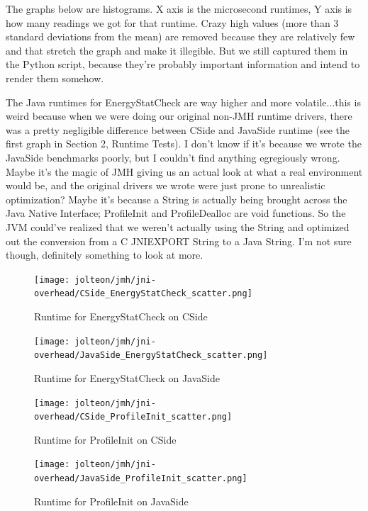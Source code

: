 \documentclass{article}
\begin{document}
    The graphs below are histograms. X axis is the microsecond runtimes, Y axis is how many readings we got
    for that runtime. Crazy high values (more than 3 standard deviations from the mean) are removed because they are relatively few and that stretch the graph and make it illegible. But we still captured
    them in the Python script, because they're probably important information and intend to render them somehow.

    The Java runtimes for EnergyStatCheck are way higher and more volatile...this is weird because when we were doing our original non-JMH runtime drivers,
    there was a pretty negligible difference between CSide and JavaSide runtime (see the first graph in Section 2, Runtime Tests). I don't know if it's because we wrote the JavaSide benchmarks poorly, but I couldn't find anything egregiously wrong. Maybe it's the magic of JMH giving us an actual look at what a real environment would be, and the original drivers we wrote were just prone to unrealistic optimization? Maybe it's because a String is actually being brought across the Java Native Interface; ProfileInit and ProfileDealloc are void functions. So the JVM could've realized that we weren't actually using the String and optimized out the conversion from a C JNIEXPORT String to a Java String. I'm not sure though, definitely something to look at more.
    
    
    \begin{figure}[H]
	    \centering
	    \texttt{[image: jolteon/jmh/jni-overhead/CSide\_EnergyStatCheck\_scatter.png]}
	    \caption{Runtime for EnergyStatCheck on CSide}
	    \label{fig:jolteon-jmh-runtime-energystatcheck-c}
    \end{figure}
    \begin{figure}[H]
	    \centering
	    \texttt{[image: jolteon/jmh/jni-overhead/JavaSide\_EnergyStatCheck\_scatter.png]}
	    \caption{Runtime for EnergyStatCheck on JavaSide}
	    \label{fig:jolteon-jmh-runtime-energystatcheck-java}
    \end{figure}
    
    \begin{figure}[H]
	    \centering
	    \texttt{[image: jolteon/jmh/jni-overhead/CSide\_ProfileInit\_scatter.png]}
	    \caption{Runtime for ProfileInit on CSide}
	    \label{fig:jolteon-jmh-runtime-profileinit-c}
    \end{figure}
    \begin{figure}[H]
	    \centering
	    \texttt{[image: jolteon/jmh/jni-overhead/JavaSide\_ProfileInit\_scatter.png]}
	    \caption{Runtime for ProfileInit on JavaSide}
	    \label{fig:jolteon-jmh-runtime-profileinit-java}
    \end{figure}
\end{document}
